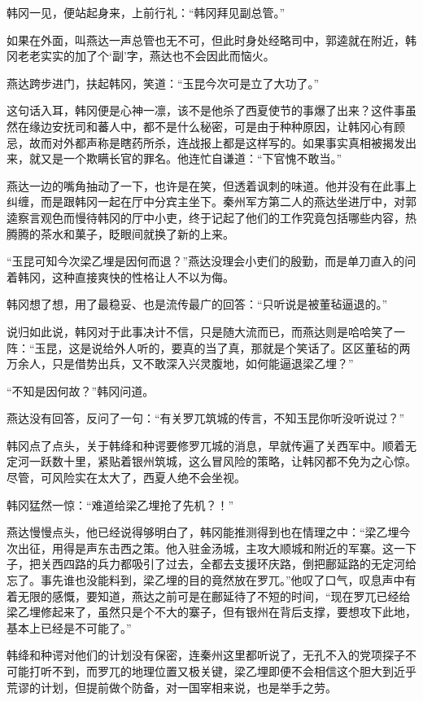 韩冈一见，便站起身来，上前行礼：“韩冈拜见副总管。”

如果在外面，叫燕达一声总管也无不可，但此时身处经略司中，郭逵就在附近，韩冈老老实实的加了个‘副’字，燕达也不会因此而恼火。

燕达跨步进门，扶起韩冈，笑道：“玉昆今次可是立了大功了。”

这句话入耳，韩冈便是心神一凛，该不是他杀了西夏使节的事爆了出来？这件事虽然在缘边安抚司和蕃人中，都不是什么秘密，可是由于种种原因，让韩冈心有顾忌，故而对外都声称是瞎药所杀，连战报上都是这样写的。如果事实真相被揭发出来，就又是一个欺瞒长官的罪名。他连忙自谦道：“下官愧不敢当。”

燕达一边的嘴角抽动了一下，也许是在笑，但透着讽刺的味道。他并没有在此事上纠缠，而是跟韩冈一起在厅中分宾主坐下。秦州军方第二人的燕达坐进厅中，对郭逵察言观色而慢待韩冈的厅中小吏，终于记起了他们的工作究竟包括哪些内容，热腾腾的茶水和菓子，眨眼间就换了新的上来。

“玉昆可知今次梁乙埋是因何而退？”燕达没理会小吏们的殷勤，而是单刀直入的问着韩冈，这种直接爽快的性格让人不以为侮。

韩冈想了想，用了最稳妥、也是流传最广的回答：“只听说是被董毡逼退的。”

说归如此说，韩冈对于此事决计不信，只是随大流而已，而燕达则是哈哈笑了一阵：“玉昆，这是说给外人听的，要真的当了真，那就是个笑话了。区区董毡的两万余人，只是借势出兵，又不敢深入兴灵腹地，如何能逼退梁乙埋？”

“不知是因何故？”韩冈问道。

燕达没有回答，反问了一句：“有关罗兀筑城的传言，不知玉昆你听没听说过？”

韩冈点了点头，关于韩绛和种谔要修罗兀城的消息，早就传遍了关西军中。顺着无定河一跃数十里，紧贴着银州筑城，这么冒风险的策略，让韩冈都不免为之心惊。尽管，可风险实在太大了，西夏人绝不会坐视。

韩冈猛然一惊：“难道给梁乙埋抢了先机？！”

燕达慢慢点头，他已经说得够明白了，韩冈能推测得到也在情理之中：“梁乙埋今次出征，用得是声东击西之策。他入驻金汤城，主攻大顺城和附近的军寨。这一下子，把关西四路的兵力都吸引了过去，全都去支援环庆路，倒把鄜延路的无定河给忘了。事先谁也没能料到，梁乙埋的目的竟然放在罗兀。”他叹了口气，叹息声中有着无限的感慨，要知道，燕达之前可是在鄜延待了不短的时间，“现在罗兀已经给梁乙埋修起来了，虽然只是个不大的寨子，但有银州在背后支撑，要想攻下此地，基本上已经是不可能了。”

韩绛和种谔对他们的计划没有保密，连秦州这里都听说了，无孔不入的党项探子不可能打听不到，而罗兀的地理位置又极关键，梁乙埋即便不会相信这个胆大到近乎荒谬的计划，但提前做个防备，对一国宰相来说，也是举手之劳。

